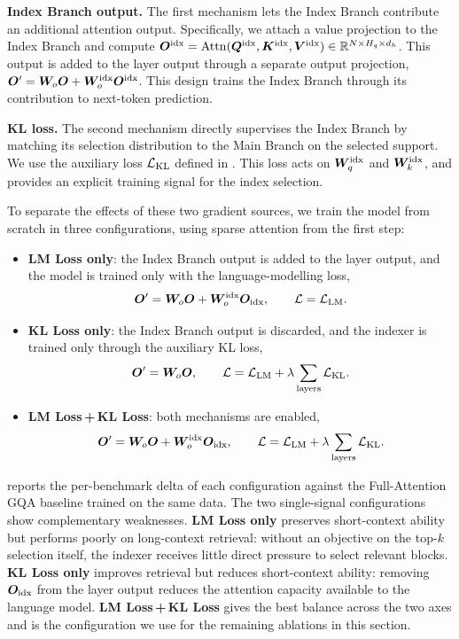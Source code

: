 \textbf{Index Branch output.} The first mechanism lets the Index Branch contribute an additional attention output. Specifically, we attach a value projection to the Index Branch and compute ${\bm{O}}^{\rm idx}=\mathrm{Attn}({\bm{Q}}^{\rm idx}, {\bm{K}}^{\rm idx}, {\bm{V}}^{\rm idx})\in \mathbb{R}^{N \times H_q \times d_h}$. This output is added to the layer output through a separate output projection, ${\bm{O}}'={\bm{W}}_o {\bm{O}}+{\bm{W}}^{\rm idx}_o {\bm{O}}^{\rm idx}$. 
This design trains the Index Branch through its contribution to next-token prediction.


\textbf{KL loss.} The second mechanism directly supervises the Index Branch by matching its selection distribution to the Main Branch on the selected support. We use the auxiliary loss $\mathcal{L}_{\rm KL}$ defined in . This loss acts on ${\bm{W}}^{\rm idx}_q$ and ${\bm{W}}^{\rm idx}_k$, and provides an explicit training signal for the index selection. 

To separate the effects of these two gradient sources, we train the model from scratch in three configurations, using sparse attention from the first step:
\begin{itemize}
    \item \textbf{LM Loss only}: the Index Branch output is added to the layer output, and the model is trained only with the language-modelling loss,
    \begin{equation}
    {\bm{O}}' = {\bm{W}}_o {\bm{O}} + {\bm{W}}^{\rm idx}_o {\bm{O}}_{\rm idx},
    \qquad
    \mathcal{L} = \mathcal{L}_{\rm LM}.
    \end{equation}

    \item \textbf{KL Loss only}: the Index Branch output is discarded, and the indexer is trained only through the auxiliary KL loss,
    \begin{equation}
    {\bm{O}}' = {\bm{W}}_o {\bm{O}},
    \qquad
    \mathcal{L} =\mathcal{L}_{\rm LM}+\lambda \sum_{\rm layers} \mathcal{L}_{\rm KL}.
    \end{equation}

    \item \textbf{LM Loss\,+\,KL Loss}: both mechanisms are enabled,
    \begin{equation}
    {\bm{O}}' = {\bm{W}}_o {\bm{O}} + {\bm{W}}^{\rm idx}_o {\bm{O}}_{\rm idx},
    \qquad
    \mathcal{L} =\mathcal{L}_{\rm LM}+\lambda \sum_{\rm layers} \mathcal{L}_{\rm KL}.
    \end{equation}
\end{itemize}

 reports the per-benchmark delta of each configuration against the Full-Attention GQA baseline trained on the same data. The two single-signal configurations show complementary weaknesses. \textbf{LM Loss only} preserves short-context ability but performs poorly on long-context retrieval: without an objective on the top-$k$ selection itself, the indexer receives little direct pressure to select relevant blocks. \textbf{KL Loss only} improves retrieval but reduces short-context ability: removing ${\bm{O}}_{\rm idx}$ from the layer output reduces the attention capacity available to the language model. \textbf{LM Loss\,+\,KL Loss} gives the best balance across the two axes and is the configuration we use for the remaining ablations in this section.

